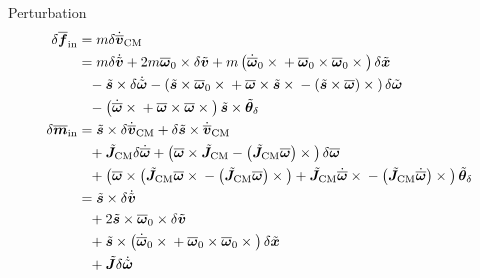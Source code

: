 \documentclass[10pt,dvips,fleqn,subeqn]{report}
\newcommand{\T}[1]{\bm{#1}}
\newcommand{\TT}[1]{\bm{#1}}
\begin{document}
Perturbation
\begin{subequations}
\begin{align}
	\delta\overline{\T{f}}_{\text{in}}
	&= m \delta\dot{\overline{\T{v}}}_{\text{CM}}
	\nonumber \\
	&= m \delta\dot{\tilde{\T{v}}}
	+ 2 m \overline{\T{\omega}}_0 \times \delta\tilde{\T{v}}
	+ m \plbr{
		\dot{\overline{\T{\omega}}}_0 \times{}
		+ \overline{\T{\omega}}_0 \times \overline{\T{\omega}}_0 \times{}
	} \delta\tilde{\T{x}}
	\nonumber \\ &\hphantom{=}
	- \tilde{\T{s}} \times \delta\dot{\tilde{\T{\omega}}}
	- \plbr{
		\tilde{\T{s}} \times \overline{\T{\omega}}_0 \times{}
		+ \overline{\T{\omega}} \times \tilde{\T{s}} \times{}
		- \plbr{\tilde{\T{s}} \times \overline{\T{\omega}}} \times{}
	} \delta\tilde{\T{\omega}}
	\nonumber \\ &\hphantom{=}
	- \plbr{
		\dot{\overline{\T{\omega}}} \times{}
		+ \overline{\T{\omega}} \times \overline{\T{\omega}} \times{}
	} \tilde{\T{s}} \times \tilde{\T{\theta}}_{\delta}
	\\
%
	\delta\overline{\T{m}}_{\text{in}}
	&= \tilde{\T{s}} \times \delta\dot{\overline{\T{v}}}_{\text{CM}}
	+ \delta\tilde{\T{s}} \times \dot{\overline{\T{v}}}_{\text{CM}}
	\nonumber \\ &\hphantom{=}
	+ \tilde{\TT{J}}_{\text{CM}} \delta\dot{\overline{\T{\omega}}}
	+ \plbr{
		\overline{\T{\omega}} \times \tilde{\TT{J}}_{\text{CM}}
		- \plbr{\tilde{\TT{J}}_{\text{CM}} \overline{\T{\omega}}} \times{}
	} \delta\overline{\T{\omega}}
	\nonumber \\ &\hphantom{=}
	+ \plbr{
		\overline{\T{\omega}} \times \plbr{
			\tilde{\TT{J}}_{\text{CM}} \overline{\T{\omega}} \times{}
			- \plbr{\tilde{\TT{J}}_{\text{CM}} \overline{\T{\omega}}} \times{}
		}
		+ \tilde{\TT{J}}_{\text{CM}} \dot{\overline{\T{\omega}}} \times{}
		- \plbr{\tilde{\TT{J}}_{\text{CM}} \dot{\overline{\T{\omega}}}} \times{}
	} \tilde{\T{\theta}}_{\delta}
	\nonumber \\
	&= \tilde{\T{s}} \times \delta\dot{\tilde{\T{v}}}
	\nonumber \\ &\hphantom{=}
	+ 2 \tilde{\T{s}} \times \overline{\T{\omega}}_0 \times \delta\tilde{\T{v}}
	\nonumber \\ &\hphantom{=}
	+ \tilde{\T{s}} \times \plbr{
		\dot{\overline{\T{\omega}}}_0 \times{}
		+ \overline{\T{\omega}}_0 \times \overline{\T{\omega}}_0 \times{}
	} \delta\tilde{\T{x}}
	\nonumber \\ &\hphantom{=}
	+ \tilde{\TT{J}} \delta\dot{\tilde{\T{\omega}}}

\end{align}
\end{subequations}
\end{document}
